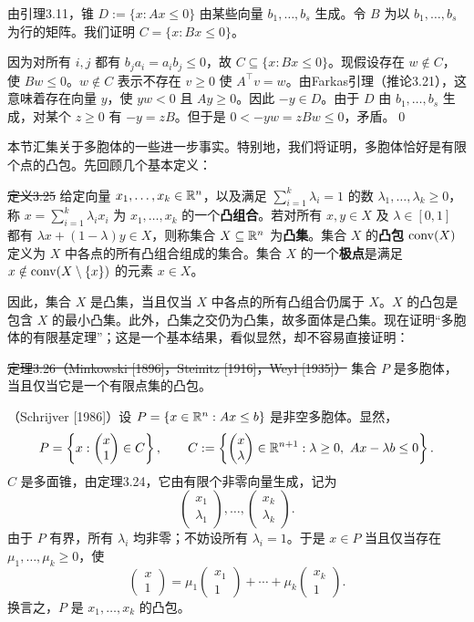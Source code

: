由引理3.11，锥 $D:=\{x:Ax\le0\}$ 由某些向量 $b_1,\ldots,b_s$ 生成。令 $B$ 为以 $b_1,\ldots,b_s$ 为行的矩阵。我们证明 $C=\{x:Bx\le0\}$。

因为对所有 $i,j$ 都有 $b_ja_i=a_ib_j\le0$，故 $C\subseteq\{x:Bx\le0\}$。现假设存在 $w\notin C$，使 $Bw\le0$。$w\notin C$ 表示不存在 $v\ge0$ 使 $A^\top v=w$。由Farkas引理（推论3.21），这意味着存在向量 $y$，使 $yw<0$ 且 $Ay\ge0$。因此 $-y\in D$。由于 $D$ 由 $b_1,\ldots,b_s$ 生成，对某个 $z\ge0$ 有 $-y=zB$。但于是 $0<-yw=zBw\le0$，矛盾。\qed

本节汇集关于多胞体的一些进一步事实。特别地，我们将证明，多胞体恰好是有限个点的凸包。先回顾几个基本定义：

\st{定义3.25} 给定向量 $x_1,\ldots,x_k\in\mathbb R^n$，以及满足 $\sum_{i=1}^k\lambda_i=1$ 的数 $\lambda_1,\ldots,\lambda_k\ge0$，称 $x=\sum_{i=1}^k\lambda_i x_i$ 为 $x_1,\ldots,x_k$ 的一个\textbf{凸组合}。若对所有 $x,y\in X$ 及 $\lambda\in[0,1]$ 都有 $\lambda x+(1-\lambda)y\in X$，则称集合 $X\subseteq\mathbb R^n$ 为\textbf{凸集}。集合 $X$ 的\textbf{凸包} $\operatorname{conv}(X)$ 定义为 $X$ 中各点的所有凸组合组成的集合。集合 $X$ 的一个\textbf{极点}是满足 $x\notin\operatorname{conv}(X\setminus\{x\})$ 的元素 $x\in X$。

因此，集合 $X$ 是凸集，当且仅当 $X$ 中各点的所有凸组合仍属于 $X$。$X$ 的凸包是包含 $X$ 的最小凸集。此外，凸集之交仍为凸集，故多面体是凸集。现在证明“多胞体的有限基定理”；这是一个基本结果，看似显然，却不容易直接证明：

\st{定理3.26（Minkowski [1896]，Steinitz [1916]，Weyl [1935]）} 集合 $P$ 是多胞体，当且仅当它是一个有限点集的凸包。

\pr （Schrijver [1986]）设 $P=\{x\in\mathbb R^n:Ax\le b\}$ 是非空多胞体。显然，
\[
P=\left\{x:\begin{pmatrix}x\\1\end{pmatrix}\in C\right\},
\qquad
C:=\left\{\begin{pmatrix}x\\\lambda\end{pmatrix}\in\mathbb R^{n+1}:
\lambda\ge0,\ Ax-\lambda b\le0\right\}.
\]
$C$ 是多面锥，由定理3.24，它由有限个非零向量生成，记为
\[
\begin{pmatrix}x_1\\\lambda_1\end{pmatrix},\ldots,
\begin{pmatrix}x_k\\\lambda_k\end{pmatrix}.
\]
由于 $P$ 有界，所有 $\lambda_i$ 均非零；不妨设所有 $\lambda_i=1$。于是 $x\in P$ 当且仅当存在 $\mu_1,\ldots,\mu_k\ge0$，使
\[
\begin{pmatrix}x\\1\end{pmatrix}
=\mu_1\begin{pmatrix}x_1\\1\end{pmatrix}
+\cdots+\mu_k\begin{pmatrix}x_k\\1\end{pmatrix}.
\]
换言之，$P$ 是 $x_1,\ldots,x_k$ 的凸包。

